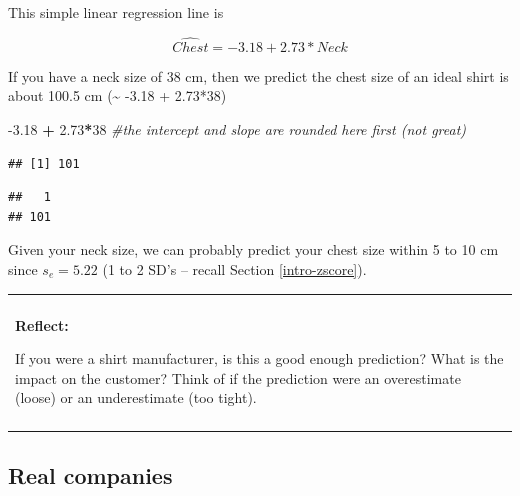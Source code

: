 \documentclass[]{book}
\newenvironment{Shaded}{\begin{snugshade}}{\end{snugshade}}
\newcommand{\CommentTok}[1]{\textcolor[rgb]{0.56,0.35,0.01}{\textit{#1}}}
\newcommand{\DataTypeTok}[1]{\textcolor[rgb]{0.13,0.29,0.53}{#1}}
\newcommand{\DecValTok}[1]{\textcolor[rgb]{0.00,0.00,0.81}{#1}}
\newcommand{\FloatTok}[1]{\textcolor[rgb]{0.00,0.00,0.81}{#1}}
\newcommand{\KeywordTok}[1]{\textcolor[rgb]{0.13,0.29,0.53}{\textbf{#1}}}
\newcommand{\NormalTok}[1]{#1}
\newcommand{\OperatorTok}[1]{\textcolor[rgb]{0.81,0.36,0.00}{\textbf{#1}}}
\newcommand{\StringTok}[1]{\textcolor[rgb]{0.31,0.60,0.02}{#1}}
\newenvironment{reflect}
{
    \begin{center}
    
    \begin{tabular}{|p{0.8\textwidth}|}
    \rowcolor{LightBlue}
    \hline\\
    \rowcolor{LightBlue}
    \textbf{Reflect:}
}
{
    \\\rowcolor{LightBlue}
    \\\hline
    \end{tabular} 
    \end{center}
}
\begin{document}
This simple linear regression line is

\[\widehat{Chest} = -3.18 + 2.73*Neck\]

If you have a neck size of 38 cm, then we predict the chest size of an ideal shirt is about 100.5 cm (\textasciitilde{} -3.18 + 2.73*38)

\begin{Shaded}
\begin{Highlighting}[]
\FloatTok{-3.18} \OperatorTok{+}\StringTok{ }\FloatTok{2.73}\OperatorTok{*}\DecValTok{38} \CommentTok{#the intercept and slope are rounded here first (not great)}
\end{Highlighting}
\end{Shaded}

\begin{verbatim}
## [1] 101
\end{verbatim}

\begin{Shaded}
\end{Shaded}

\begin{verbatim}
##   1 
## 101
\end{verbatim}

Given your neck size, we can probably predict your chest size within 5 to 10 cm since \(s_e = 5.22\) (1 to 2 SD's -- recall Section \ref{intro-zscore}).

\begin{reflect}
If you were a shirt manufacturer, is this a good enough prediction? What
is the impact on the customer? Think of if the prediction were an
overestimate (loose) or an underestimate (too tight).
\end{reflect}

\hypertarget{real-companies}{%
\subsection{Real companies}\label{real-companies}}
\end{document}
